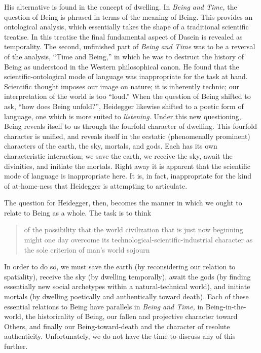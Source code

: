 \documentclass[leqno, 12pt]{turabian-researchpaper}
\begin{document}
	His alternative is found in the concept of dwelling. In \textit{Being and Time,}
	the question of Being is phrased in terms of the meaning of Being. This
	provides an ontological analysis, which essentially takes the shape of a traditional
	scientific treatise. In this treatise the final fundamental aspect of Dasein
	is revealed as temporality. The second, unfinished part of \textit{Being and
	Time} was to be a reversal of the analysis, \enquote{Time and Being,} in which
	he was to destruct the history of Being as understood in the Western philosophical
	canon. He found that the scientific-ontological mode of language was
	inappropriate for the task at hand. Scientific thought imposes our image on nature;
	it is inherently technic; our interpretation of the world is too \enquote{loud.}
	When the question of Being shifted to ask, \enquote{how does Being unfold?}, Heidegger
	likewise shifted to a poetic form of language, one which is more suited to
	\textit{listening.} Under this new questioning, Being reveals itself to us
	through the fourfold character of dwelling. This fourfold character is unified,
	and reveals itself in the ecstatic (phenomenally prominent) characters of the
	earth, the sky, mortals, and gods. Each has its own characteristic interaction;
	we save the earth, we receive the sky, await the divinities, and initiate the
	mortals. Right away it is apparent that the scientific mode of language is inappropriate
	here. It is, in fact, inappropriate for the kind of at-home-ness that
	Heidegger is attempting to articulate.

	The question for Heidegger, then, becomes the manner in which we ought to
	relate to Being as a whole. The task is to think \blockquote[{\cite[p437]{heidegger2008d}}]{of the possibility that the world civilization that is just now beginning might one day overcome its technological-scientific-industrial character as the sole criterion of man's world sojourn}.
	In order to do so, we must save the earth (by reconsidering our relation to
	spatiality), receive the sky (by dwelling temporally), await the gods (by
	finding essentially new social archetypes within a natural-technical world),
	and initiate mortals (by dwelling poetically and authentically toward death). Each
	of these essential relations to Being have parallels in \textit{Being and Time,}
	in Being-in-the-world, the historicality of Being, our fallen and projective
	character toward Others, and finally our Being-toward-death and the character of
	resolute authenticity. Unfortunately, we do not have the time to discuss any of
	this further.
\end{document}
